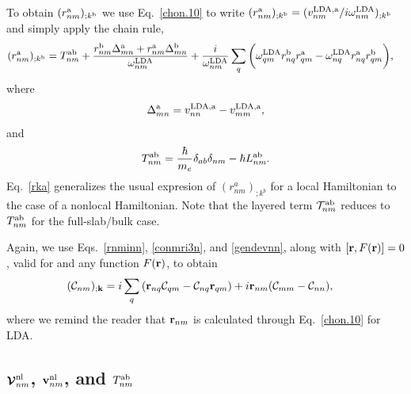 \documentclass[floatfix,prb,aps,superscriptaddress,11pt,preprint,letterpaper]{revtex4}
\begin{document}
To obtain $(r^{\mathrm{a}}_{nm})_{;k^{\mathrm{b}}}$ we use Eq.~\eqref{chon.10} to
write
$(r^{\mathrm{a}}_{nm})_{;k^{\mathrm{b}}}
=(v^{\mathrm{LDA},\mathrm{a}}_{nm}/i\omega^{\mathrm{LDA}}_{nm})_{;k^{\mathrm{b}}}
$ and simply apply the chain rule,
\begin{align}\label{rka}
(r^{\mathrm{a}}_{nm})_{;k^{\mathrm{b}}}
&=
T^{\mathrm{a}\mathrm{b}}_{nm}
+
\frac{ 
r^{\mathrm{b}}_{nm}
\Delta^{\mathrm{a}}_{mn}
+r^{\mathrm{a}}_{nm}
\Delta^{\mathrm{b}}_{mn}
}
{\omega^{\mathrm{LDA}}_{nm}}
+
\frac{i}{\omega^{\mathrm{LDA}}_{nm}}
\sum_{q}
\bigg(
\omega^{\mathrm{LDA}}_{q m} 
r^{\mathrm{b}}_{nq} 
r^{\mathrm{a}}_{q m}
-
\omega^{\mathrm{LDA}}_{nq} 
r^{\mathrm{a}}_{nq} 
r^{\mathrm{b}}_{q m}
\bigg)
,
\end{align} 
where 
\begin{eqnarray}\label{del}
\Delta^{\mathrm{a}}_{mn}
=
v^{\mathrm{LDA},\mathrm{a}}_{nn}  
-
v^{\mathrm{LDA},\mathrm{a}}_{mm}  
,
\end{eqnarray}
and
\begin{align}\label{tau.1n} 
T_{nm}^{\mathrm{a}\mathrm{b}}
=\frac{\hbar}{m_e}\delta_{ab}\delta_{nm} 
-\hbar L^{\mathrm{a}\mathrm{b}}_{nm} 
.
\end{align}
Eq.~\eqref{rka} generalizes the usual expresion of
$(r^a_{nm})_{;k^b}$ for a local 
Hamiltonian
\cite{aversaPRB95,nastosPRB05,cabellosPRB09,rashkeevPRB98}
to
the case of a
nonlocal Hamiltonian.
Note that the layered term
${\cal T}^{\mathrm{a}\mathrm{b}}_{nm}$ reduces to $T^{\mathrm{a}\mathrm{b}}_{nm}$
for the full-slab/bulk case.

Again, we use Eqs.~\eqref{rnminn}, \eqref{conmri3n}, and \eqref{gendevnn},
along with $[\mathbf{r},F(\mathbf{r})]=0$, valid for 
and any function $F(\mathbf{r})$, 
to obtain 
\begin{align} 
({\mathbf{\cal C}}_{nm})_{;\mathbf{k}}
&=
i 
\sum_{q} 
 \left(\mathbf{r}_{nq}
{\mathbf{\cal C}}_{qm}
-
{\mathbf{\cal C}}_{nq}
\mathbf{r}_{qm}
\right) 
+i\mathbf{r}_{nm}({\mathbf{\cal C}}_{mm}-{\mathbf{\cal C}}_{nn}) 
,
\end{align} 
where we remind the reader that $\mathbf{r}_{nm}$ 
is calculated through 
Eq.~\eqref{chon.10} for LDA. 


\subsection{
\texorpdfstring{$\boldsymbol{\mathcal{\cal V}}^{\mathrm{nl}}_{nm}$}{Vnonlocal},
\texorpdfstring{$\mathbf{v}^{\mathrm{nl}}_{nm}$}{Vnonlocal}, and 
\texorpdfstring{$T^{\mathrm{a}\mathrm{b}}_{nm}$}{[r,vnl]}}
\label{vesnl}
\end{document}
